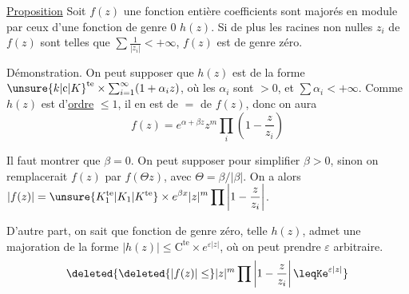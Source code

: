 \uline{Proposition} \quad Soit $f(z)$ une fonction entière   
  coefficients sont majorés en module par
ceux d'une fonction de genre $0$ $h(z)$. Si
de plus les racines non nulles $z_i$ de $f(z)$
sont telles que $\sum\frac{1}{|z_i|}<+\infty$, $f(z)$ est de
genre zéro.


Démonstration. On peut supposer
que $h(z)$ est de la forme $\unsure{k|\mathrm c|K}^{\mathrm{te}}\times\sum_{i=1}^{\infty}(1+\alpha_i z)$, où
les $\alpha_i$ sont $>0$, et $\sum\alpha_i<+\infty$. Comme
$h(z)$ est d'\uline{ordre} $\leq1$, il en est de $=$ de
$f(z)$, donc on aura
\[ f(z)=e^{\alpha+\beta z}z^m\prod_i\left(1-\frac{z}{z_i}\right) \]

Il faut montrer que $\beta=0$. On peut supposer
pour simplifier $\beta>0$, sinon on remplacerait
$f(z)$ par $f(\Theta z)$, avec $\Theta=\beta/|\beta|$. On
a alors $\displaystyle |f(z)|=\unsure{K_1^{\mathrm{te}}|K_1|K^{\mathrm{te}}}\times e^{\beta x}|z|^m\prod\left|1-\frac{z}{z_i}\right|$.

D'autre part, on sait que   fonction
de genre zéro, telle $h(z)$, admet une
majoration de la forme $|h(z)|\leq\mathrm C^{\mathrm{te}}\times e^{\varepsilon|z|}$, où
on peut prendre $\varepsilon$ arbitraire. 
\[ \deleted{\deleted{|f(z)|\leq}|z|^m\prod\left|1-\frac{z}{z_i}\right|\leqKe^{\varepsilon|z|}} \]
